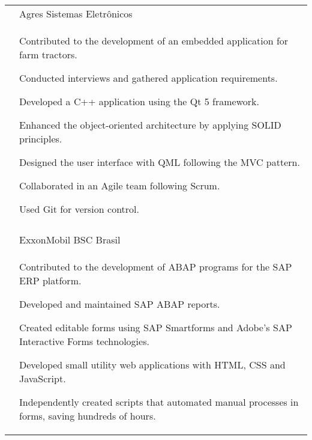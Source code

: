 \documentclass[a4paper,12pt]{article}
\begin{document}
\begin{longtable}{r|p{14.3cm}}
 & Agres Sistemas Eletrônicos \\*
 &\footnotesize{
    \begin{itemize*}[label=\Large\textbullet]
        \item Contributed to the development of an embedded application for farm tractors.
        \item \mbox{Conducted} interviews and gathered application requirements.
        \item Developed a \mbox{C++} \mbox{application} using the Qt 5 framework.
        \item Enhanced the object-oriented architecture by \mbox{applying} SOLID principles.
        \item Designed the user interface with QML following the MVC pattern.
        \item Collaborated in an Agile team following Scrum.
        \item Used Git for version control.
    \end{itemize*}
}
 \\ \\

& ExxonMobil BSC Brasil\\*
&\footnotesize{
    \begin{itemize*}[label=\Large\textbullet]
        \item Contributed to the development of ABAP programs for the SAP ERP platform.
        \item Developed and maintained SAP ABAP reports.
        \item Created editable forms using SAP Smartforms and Adobe's SAP Interactive Forms technologies.
        \item Developed small utility web applications with HTML, CSS and JavaScript.
        \item Independently created scripts that automated manual processes in forms, saving hundreds of hours.
    \end{itemize*}
}
\end{longtable}
\end{document}
